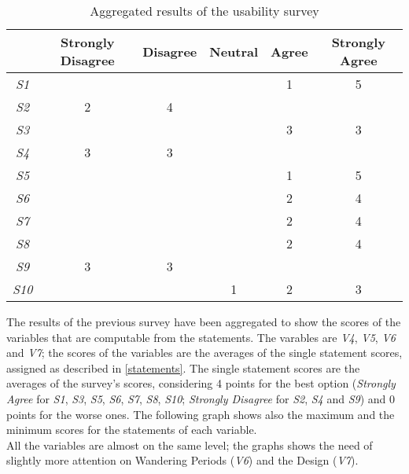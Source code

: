 \documentclass[../../UsabilityReport.tex]{subfiles}
\begin{document}
	\begin{table}[htb]
		\centering
		\caption{Aggregated results of the usability survey}
		\begin{tabular}{|c|c|c|c|c|c|}
			\hline
			& \multicolumn{1}{|p{14mm}|}{Strongly Disagree} & \multicolumn{1}{|p{14mm}|}{Disagree} & \multicolumn{1}{|p{14mm}|}{Neutral} & \multicolumn{1}{|p{14mm}|}{Agree} & \multicolumn{1}{|p{14mm}|}{Strongly Agree} \\ \hline
			\textit{S1}  & & & & \multicolumn{1}{c|}{1} & \multicolumn{1}{c|}{5} \\ \hline
			\textit{S2}  & \multicolumn{1}{c|}{2} & \multicolumn{1}{c|}{4} & & & \\ \hline
			\textit{S3}  & & & & \multicolumn{1}{c|}{3} & \multicolumn{1}{c|}{3} \\ \hline
			\textit{S4}  & \multicolumn{1}{c|}{3} & \multicolumn{1}{c|}{3} & & & \\ \hline
			\textit{S5}  & & & & \multicolumn{1}{c|}{1} & \multicolumn{1}{c|}{5} \\ \hline
			\textit{S6}  & & & & \multicolumn{1}{c|}{2} & \multicolumn{1}{c|}{4} \\ \hline
			\textit{S7}  & & & & \multicolumn{1}{c|}{2} & \multicolumn{1}{c|}{4} \\ \hline
			\textit{S8}  & & & & \multicolumn{1}{c|}{2} & \multicolumn{1}{c|}{4} \\ \hline
			\textit{S9}  & \multicolumn{1}{c|}{3} & \multicolumn{1}{c|}{3} & & & \\ \hline
			\textit{S10} & & & \multicolumn{1}{c|}{1} & \multicolumn{1}{c|}{2} & \multicolumn{1}{c|}{3} \\ \hline
		\end{tabular}
	\end{table}
	The results of the previous survey have been aggregated to show the scores of the variables that are computable from the statements. The varables are \textit{V4}, \textit{V5}, \textit{V6} and \textit{V7}; the scores of the variables are the averages of the single statement scores, assigned as described in \ref{statements}. The single statement scores are the averages of the survey's scores, considering 4 points for the best option (\textit{Strongly Agree} for \textit{S1}, \textit{S3}, \textit{S5}, \textit{S6}, \textit{S7}, \textit{S8}, \textit{S10}; \textit{Strongly Disagree} for \textit{S2}, \textit{S4} and \textit{S9}) and 0 points for the worse ones. The following graph shows also the maximum and the minimum scores for the statements of each variable.\\
	All the variables are almost on the same level; the graphs shows the need of slightly more attention on Wandering Periods (\textit{V6}) and the Design (\textit{V7}).
\end{document}
